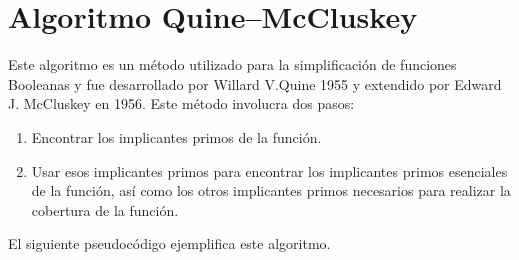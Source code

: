 \section{Algoritmo Quine–McCluskey}

Este algoritmo es un método utilizado para la simplificación de funciones Booleanas y fue desarrollado por Willard V.Quine 1955 y extendido por Edward J. McCluskey en 1956. Este método involucra dos pasos:
\begin{enumerate}
	\item Encontrar los implicantes primos de la función.
	\item Usar esos implicantes primos para encontrar los implicantes primos esenciales de la función, así como los otros implicantes primos necesarios para realizar la cobertura de la función.
\end{enumerate}

El siguiente pseudocódigo ejemplifica este algoritmo.

\begin{algorithm}[h]
	\SetAlgoLined
\end{algorithm}


